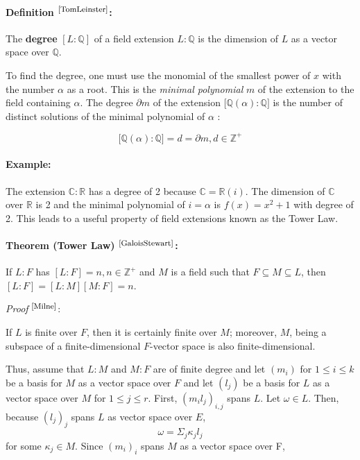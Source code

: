 \documentclass{article}
\begin{document}
\paragraph{Definition $^{\textrm{\footnotesize\cite{TomLeinster}}}$:} The \textbf{degree} $[L: \mathbb{Q}]$ of a field extension $L : \mathbb{Q}$ is the dimension of $L$ as a vector space over $\mathbb{Q}$.
\par
To find the degree, one must use the monomial of the smallest power of $x$ with the number $\alpha$ as a root. This is the \textit{minimal polynomial} $m$ of the extension to the field containing $\alpha$. The degree $\partial m$ of the extension $\lbrack \mathbb{Q}(\alpha) : \mathbb{Q} \rbrack$ is the number of distinct solutions of the minimal polynomial of $\alpha$ :

$$\lbrack \mathbb{Q}(\alpha) : \mathbb{Q} \rbrack = d = \partial m , d\in\mathbb{Z}^{+}$$

\paragraph{Example:}
The extension $\mathbb{C}:\mathbb{R}$ has a degree of 2 because $\mathbb{C} = \mathbb{R}(i)$. The dimension of $\mathbb{C}$ over $\mathbb{R}$ is 2 and the minimal polynomial of $i = \alpha$ is $f(x) = x^2 + 1$ with degree of 2. This leads to a useful property of field extensions known as the Tower Law.

\paragraph{Theorem (Tower Law) $^{\textrm{\footnotesize\cite{GaloisStewart}}}$:} If $L : F$ has $[ L : F ] = n, n\in\mathbb{Z}^{+}$ and $M$ is a field such that $ F \subseteq M \subseteq L$, then 
$ [ L : F ] = [ L : M ][ M : F ] = n $.
\par
\textit{Proof} $^{\textrm{\footnotesize\cite{Milne}}}$: 
\par
If $L$ is finite over $F$, then it is certainly finite over $M$; moreover, $M$, being a
subspace of a finite-dimensional $F$-vector space is also finite-dimensional.
\par Thus, assume that $L:M$ and $M:F$ are of finite degree and let $(m_i)$ for $1\leq i \leq k$ be a basis for $M$ as a vector space over $F$ and let $(l_j)$ be a basis for $L$ as a vector space over $M$ for $1\leq j \leq r$.
First, $(m_i l_j)_{i,j}$ spans $L$. Let $\omega \in L$. Then, because $(l_j)_j$ spans $L$ as vector space over $E$,
$$\omega = \Sigma_j \kappa_j l_j$$
for some $\kappa_j\in M$. Since $(m_i)_i$ spans $M$ as a vector space over F,
\end{document}
